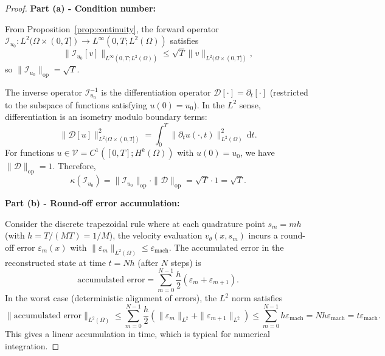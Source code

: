 \documentclass[10pt,a4paper]{amsart}
\begin{document}
\begin{proof}
\textbf{Part (a) - Condition number:}

\noindent From Proposition~\ref{prop:continuity}, the forward operator $\mathcal{I}_{u_0}: L^2(\Omega \times (0,T]) \to L^\infty(0,T; L^2(\Omega))$ satisfies
\begin{equation}
    \|\mathcal{I}_{u_0}[v]\|_{L^\infty(0,T; L^2(\Omega))} \leq \sqrt{T} \|v\|_{L^2(\Omega \times (0,T])},
\end{equation}
so $\|\mathcal{I}_{u_0}\|_{\mathrm{op}} = \sqrt{T}$.

\noindent The inverse operator $\mathcal{I}_{u_0}^{-1}$ is the differentiation operator $\mathcal{D}[\cdot] = \partial_t[\cdot]$ (restricted to the subspace of functions satisfying $u(0) = u_0$). In the $L^2$ sense, differentiation is an isometry modulo boundary terms:
\begin{equation}
    \|\mathcal{D}[u]\|_{L^2(\Omega \times (0,T])}^2 = \int_0^T \|\partial_t u(\cdot,t)\|_{L^2(\Omega)}^2 \, \mathrm{d}t.
\end{equation}
For functions $u \in \mathcal{V} = C^1([0,T]; H^k(\Omega))$ with $u(0) = u_0$, we have $\|\mathcal{D}\|_{\mathrm{op}} = 1$. Therefore,
\begin{equation}
    \kappa(\mathcal{I}_{u_0}) = \|\mathcal{I}_{u_0}\|_{\mathrm{op}} \cdot \|\mathcal{D}\|_{\mathrm{op}} = \sqrt{T} \cdot 1 = \sqrt{T}.
\end{equation}

\medskip
\noindent\textbf{Part (b) - Round-off error accumulation:}

\noindent Consider the discrete trapezoidal rule where at each quadrature point $s_m = m h$ (with $h = T/(MT) = 1/M$), the velocity evaluation $v_\theta(x, s_m)$ incurs a round-off error $\varepsilon_m(x)$ with $\|\varepsilon_m\|_{L^2(\Omega)} \leq \varepsilon_{\mathrm{mach}}$. The accumulated error in the reconstructed state at time $t = Nh$ (after $N$ steps) is
\begin{equation}
    \text{accumulated error} = \sum_{m=0}^{N-1} \frac{h}{2} \left( \varepsilon_m + \varepsilon_{m+1} \right).
\end{equation}
In the worst case (deterministic alignment of errors), the $L^2$ norm satisfies
\begin{equation}
    \|\text{accumulated error}\|_{L^2(\Omega)} \leq \sum_{m=0}^{N-1} \frac{h}{2} \left( \|\varepsilon_m\|_{L^2} + \|\varepsilon_{m+1}\|_{L^2} \right) \leq \sum_{m=0}^{N-1} h \varepsilon_{\mathrm{mach}} = Nh \varepsilon_{\mathrm{mach}} = t \varepsilon_{\mathrm{mach}}.
\end{equation}
This gives a linear accumulation in time, which is typical for numerical integration.


\end{proof}
\end{document}
